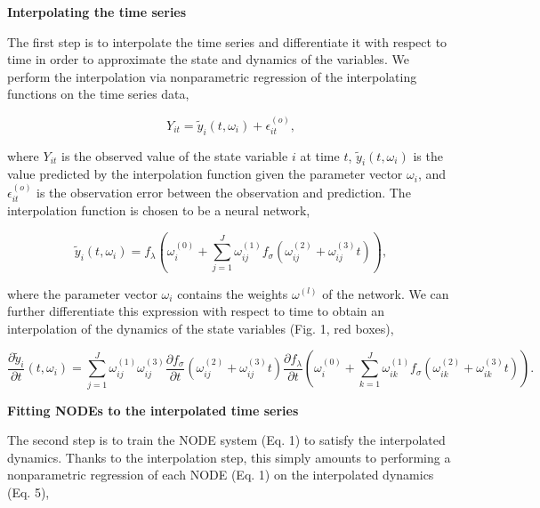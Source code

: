 \documentclass[11pt, oneside]{article}
\begin{document}
\textbf{Interpolating the time series}

The first step is to interpolate the time series and differentiate it with respect to time in order to approximate the state and dynamics of the variables.
We perform the interpolation via nonparametric regression of the interpolating functions on the time series data,

\vspace{-0.5cm}
\begin{equation}
    Y_{it} = \tilde{y}_i(t,\omega_i) + \epsilon^{(o)}_{it},
\end{equation}

where $Y_{it}$ is the observed value of the state variable $i$ at time $t$, $\tilde{y}_i(t,\omega_i)$ is the value predicted by the interpolation function given the parameter vector $\omega_i$, and $\epsilon^{(o)}_{it}$ is the observation error between the observation and prediction. 
The interpolation function is chosen to be a neural network,

\vspace{-0.5cm}
\begin{equation}
    \tilde{y}_i (t,\omega_i) = f_\lambda \left( \omega_i^{(0)} + \sum_{j=1}^{J} \omega^{(1)}_{ij} f_\sigma \left( \omega^{(2)}_{ij} + \omega^{(3)}_{ij} t \right) \right),
\end{equation}

where the parameter vector $\omega_i$ contains the weights $\omega^{(l)}$ of the network.
We can further differentiate this expression with respect to time to obtain an interpolation of the dynamics of the state variables (Fig. 1, red boxes), 

\vspace{-0.5cm}
\begin{equation}
    \frac{\partial \tilde{y}_i}{\partial t} (t, \omega_i) = \sum_{j=1}^{J} \omega^{(1)}_{ij} \omega^{(3)}_{ij} \frac{\partial f_\sigma}{\partial t} \left(\omega^{(2)}_{ij} + \omega^{(3)}_{ij} t \right) \frac{\partial f_\lambda}{\partial t} \left ( \omega^{(0)}_{i} + \sum_{k=1}^{J} \omega^{(1)}_{ik} f_\sigma \left( \omega^{(2)}_{ik} + \omega^{(3)}_{ik} t \right) \right ). 
\end{equation}

\textbf{Fitting NODEs to the interpolated time series}

The second step is to train the NODE system (Eq. 1) to satisfy the interpolated dynamics.
Thanks to the interpolation step, this simply amounts to performing a nonparametric regression of each NODE (Eq. 1) on the interpolated dynamics (Eq. 5),
\end{document}
